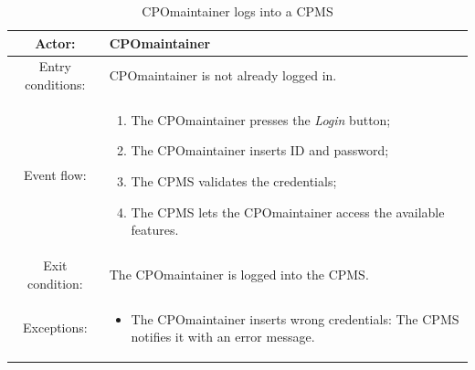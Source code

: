 \begin{table}[h]
    \begin{center}
        \begin{tabular}{|c||p{10cm}|}
            \hline
            Actor:            & \ac{CPO}maintainer                                   \\
            \hline
            Entry conditions: & \ac{CPO}maintainer is not already logged in.         \\
            \hline
            Event flow:       &
            \begin{enumerate}
                \item The \ac{CPO}maintainer presses the \textit{Login} button;
                \item The \ac{CPO}maintainer inserts ID and password;
                \item The \ac{CPMS} validates the credentials;
                \item The \ac{CPMS} lets the \ac{CPO}maintainer access the available features.
            \end{enumerate}
            \\
            \hline
            Exit condition:   & The \ac{CPO}maintainer is logged into the \ac{CPMS}. \\
            \hline
            Exceptions:       &
            \begin{itemize}
                \item The \ac{CPO}maintainer inserts wrong credentials: The \ac{CPMS} notifies it with an error message.
            \end{itemize}
            \\
            \hline
        \end{tabular}
    \end{center}
    \caption{\ac{CPO}maintainer logs into a \ac{CPMS}}
\end{table}

